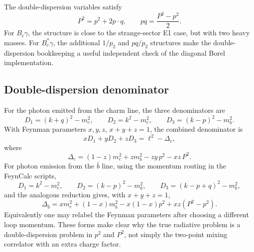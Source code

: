 \documentclass[11pt]{article}
\newcommand{\Bc}{B_c}
\newcommand{\Bcst}{B_c^\ast}
\begin{document}
The double-dispersion variables satisfy
\[
P^2=p^2+2p\cdot q,\qquad pq=\frac{P^2-p^2}{2}.
\]
For \(\Bc\gamma\), the structure is close to the strange-sector E1 case, but
with two heavy masses.  For \(\Bcst\gamma\), the additional \(1/p_2\) and
\(pq/p_2\) structures make the double-dispersion bookkeeping a useful
independent check of the diagonal Borel implementation.

\subsection*{Double-dispersion denominator}

For the photon emitted from the charm line, the three denominators are
\[
D_1=(k+q)^2-m_c^2,\qquad
D_2=k^2-m_c^2,\qquad
D_3=(k-p)^2-m_b^2 .
\]
With Feynman parameters \(x,y,z\), \(x+y+z=1\), the combined denominator is
\[
xD_1+yD_2+zD_3
=\ell^2-\Delta_c,
\]
where
\[
\Delta_c=(1-z)m_c^2+z m_b^2-zy\,p^2-xz\,P^2 .
\]
For photon emission from the \(\bar b\) line, using the momentum routing in the
FeynCalc scripts,
\[
D_1=k^2-m_c^2,\qquad
D_2=(k-p)^2-m_b^2,\qquad
D_3=(k-p+q)^2-m_b^2 ,
\]
and the analogous reduction gives, with \(x+y+z=1\),
\[
\Delta_{\bar b}
=x m_c^2+(1-x)m_b^2-x(1-x)p^2+xz(P^2-p^2).
\]
Equivalently one may relabel the Feynman parameters after choosing a different
loop momentum.  These forms make clear why the true radiative problem is a
double-dispersion problem in \(p^2\) and \(P^2\), not simply the two-point mixing
correlator with an extra charge factor.
\end{document}
